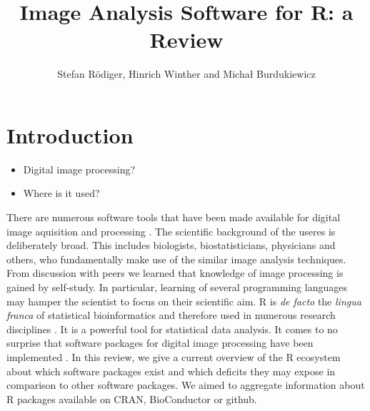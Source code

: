 \title{Image Analysis Software for R: a Review}
\author{Stefan R\"{o}diger, Hinrich Winther and Micha\l{} Burdukiewicz}

\maketitle


\section{Introduction}

\begin{itemize}
\item Digital image processing?
\item Where is it used?
\end{itemize}

There are numerous software tools that have been made available for digital 
image aquisition and processing \citep{wiesmann_review_2015, chieco_image_2013}. 
The scientific background of the useres is deliberately broad. This includes 
biologists, biostatisticians, physicians and others, who fundamentally make use 
of the similar image analysis techniques. From discussion with peers we learned 
that knowledge of image processing is gained by self-study. In particular, 
learning of several programming languages may hamper the scientist to focus on 
their scientific aim. R \citep{R} is \textit{de facto} the \textit{lingua 
franca} of statistical bioinformatics and therefore used in numerous research 
disciplines \citep{rodiger_r_2015}. It is a powerful tool for statistical data 
analysis. It comes to no surprise that software packages for digital image 
processing have been implemented \citep{frery_introduction_2013}. In this 
review, we give a current overview of the R ecosystem about which software 
packages exist and which deficits they may expose in comparison to other 
software packages. We aimed to aggregate information about R packages available 
on CRAN, BioConductor or github.

